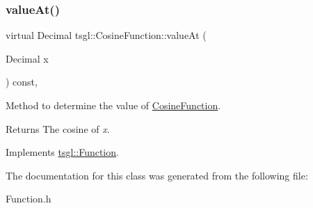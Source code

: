 \subsubsection{\texorpdfstring{value\+At()}{valueAt()}}
{\footnotesize\ttfamily virtual Decimal tsgl\+::\+Cosine\+Function\+::value\+At (\begin{DoxyParamCaption}\item[{Decimal}]{x }\end{DoxyParamCaption}) const\hspace{0.3cm}{\ttfamily [inline]}, {\ttfamily [virtual]}}



Method to determine the value of \hyperlink{classtsgl_1_1_cosine_function}{Cosine\+Function}. 

\begin{DoxyReturn}{Returns}
The cosine of {\itshape x}. 
\end{DoxyReturn}


Implements \hyperlink{classtsgl_1_1_function_affb7b3b19a04efefa29a9870d666e912}{tsgl\+::\+Function}.



The documentation for this class was generated from the following file\+:\begin{DoxyCompactItemize}
\item 
Function.\+h\end{DoxyCompactItemize}

